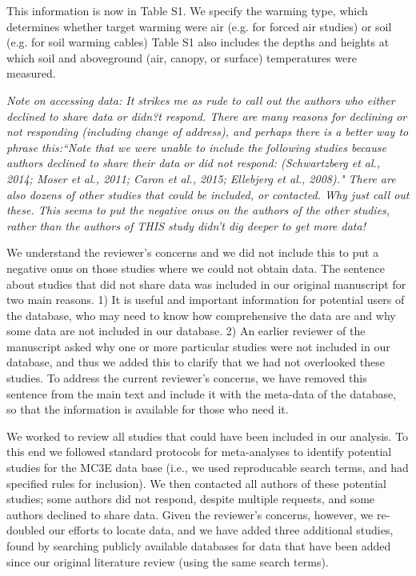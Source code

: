 \documentclass[11pt,a4paper]{letter}
\begin{document}
\begin{letter}{}
\par This information is now in Table S1. We specify the warming type, which determines whether target warming were air (e.g. for forced air studies) or soil (e.g. for soil warming cables) Table S1 also includes the depths and heights at which soil and aboveground (air, canopy, or surface) temperatures were measured. 

\par \emph{Note on accessing data:  It strikes me as rude to call out the authors who either declined to share data or didn?t respond.  There are many reasons for declining or not responding (including change of address), and perhaps there is a better way to phrase this:``Note that we were unable to include the following studies because authors declined to share their data or did not respond: (Schwartzberg et al., 2014; Moser et al., 2011; Caron et al., 2015; Ellebjerg et al., 2008)." There are also dozens of other studies that could be included, or contacted.  Why just call out these.  This seems to put the negative onus on the authors of the other studies, rather than the authors of THIS study didn't dig deeper to get more data!}

\par We understand the reviewer's concerns and we did not include this to put a negative onus on those studies where we could not obtain data.  The sentence about studies that did not share data was included in our original manuscript for two main reasons. 1) It is useful and important information for potential users of the database, who may need to know how comprehensive the data are and why some data are not included in our database. 2) An earlier reviewer of the manuscript asked why one or more particular studies were not included in our database, and thus we added this to clarify that we had not overlooked these studies. To address the current reviewer's concerns, we have removed this sentence from the main text and include it with the meta-data of the database, so that the information is available for those who need it.

\par We worked to review all studies that could have been included in our analysis. To this end we followed standard protocols for meta-analyses to identify potential studies for the MC3E data base (i.e., we used reproducable search terms, and had specified rules for inclusion). We then contacted all authors of these potential studies; some authors did not respond, despite multiple requests, and some authors declined to share data.  Given the reviewer's concerns, however, we re-doubled our efforts to locate data, and we have added three additional studies, found by searching publicly available databases for data that have been added since our original literature review (using the same search terms). 


\end{letter}
\end{document}
